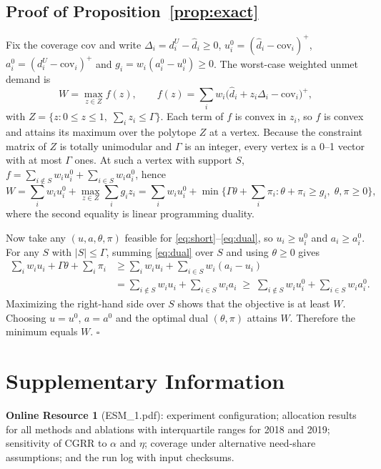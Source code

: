 \documentclass[pdflatex,sn-basic]{sn-jnl}
\theoremstyle{plain}%
\theoremstyle{remark}%
\theoremstyle{definition}%
\begin{document}
\begin{appendices}

\section{Proof of Proposition~\ref{prop:exact}}\label{secA1}

Fix the coverage $\mathrm{cov}$ and write $\Delta_i = d^U_i - \hat d_i \ge 0$, $u^0_i = (\hat d_i - \mathrm{cov}_i)^+$, $a^0_i = (d^U_i - \mathrm{cov}_i)^+$ and $g_i = w_i (a^0_i - u^0_i) \ge 0$. The worst-case weighted unmet demand is
\[
W = \max_{z \in Z} f(z), \qquad f(z) = \sum_i w_i \big(\hat d_i + z_i \Delta_i - \mathrm{cov}_i\big)^{+},
\]
with $Z = \{ z : 0 \le z \le 1,\; \sum_i z_i \le \Gamma \}$.
Each term of $f$ is convex in $z_i$, so $f$ is convex and attains its maximum over the polytope $Z$ at a vertex. Because the constraint matrix of $Z$ is totally unimodular and $\Gamma$ is an integer, every vertex is a 0--1 vector with at most $\Gamma$ ones. At such a vertex with support $S$, $f = \sum_{i \notin S} w_i u^0_i + \sum_{i \in S} w_i a^0_i$, hence
\[
W = \sum_i w_i u^0_i + \max_{z \in Z} \sum_i g_i z_i = \sum_i w_i u^0_i + \min\Big\{ \Gamma\theta + \sum_i \pi_i : \theta + \pi_i \ge g_i,\; \theta, \pi \ge 0 \Big\},
\]
where the second equality is linear programming duality.

Now take any $(u, a, \theta, \pi)$ feasible for \eqref{eq:short}--\eqref{eq:dual}, so $u_i \ge u^0_i$ and $a_i \ge a^0_i$. For any $S$ with $|S| \le \Gamma$, summing \eqref{eq:dual} over $S$ and using $\theta \ge 0$ gives
\begin{align*}
\sum_i w_i u_i + \Gamma\theta + \sum_i \pi_i
&\ge \sum_i w_i u_i + \sum_{i \in S} w_i (a_i - u_i) \\
&= \sum_{i \notin S} w_i u_i + \sum_{i \in S} w_i a_i
\;\ge\; \sum_{i \notin S} w_i u^0_i + \sum_{i \in S} w_i a^0_i .
\end{align*}
Maximizing the right-hand side over $S$ shows that the objective is at least $W$. Choosing $u = u^0$, $a = a^0$ and the optimal dual $(\theta, \pi)$ attains $W$. Therefore the minimum equals $W$. \hfill$\square$

\end{appendices}

\section*{Supplementary Information}
\textbf{Online Resource 1} (ESM\_1.pdf): experiment configuration; allocation results for all methods and ablations with interquartile ranges for 2018 and 2019; sensitivity of CGRR to $\alpha$ and $\eta$; coverage under alternative need-share assumptions; and the run log with input checksums.
\end{document}
